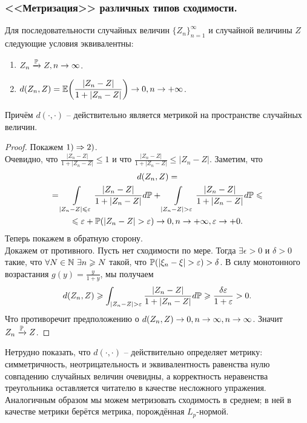 \subsubsection{<<Метризация>> различных типов сходимости.}
\begin{theorem}
    Для последовательности случайных величин $\{Z_n\}_{n = 1}^{\infty}$ и случайной величины $Z$ следующие условия эквивалентны:
    \begin{enumerate}
        \item $Z_n \xrightarrow{\P} Z, n \ra \infty$.
        \item $d(Z_n, Z) = \Ex\biggr( \dfrac{|Z_n - Z|}{1 + |Z_n - Z|}\biggr) \ra 0, n \ra +\infty$.
    \end{enumerate}
    Причём $d(\cdot, \cdot)$ -- действительно является метрикой на пространстве случайных величин.
\end{theorem}
\begin{proof}
    Покажем $1) \Ra 2)$. \\
    Очевидно, что $\frac{|Z_n - Z|}{1 + |Z_n - Z|} \leq 1$ и что $\frac{|Z_n - Z|}{1 + |Z_n - Z|} \leq |Z_n - Z|$.
    Заметим, что
    \begin{multline*}
        d(Z_n, Z) = \\ = \int\limits_{|Z_n - Z| \leq \epsilon} \dfrac{|Z_n - Z|}{1 + |Z_n - Z|}d\P + \int\limits_{|Z_n - Z| > \epsilon} \dfrac{|Z_n - Z|}{1 + |Z_n - Z|}d\P \leq \\ \leq \epsilon + \P(|Z_n - Z| > \epsilon) \ra 0, n \ra +\infty, \epsilon \ra +0.
    \end{multline*}
    Теперь покажем в обратную сторону. \\
    Докажем от противного. Пусть нет сходимости по мере. Тогда $\exists \epsilon > 0$ и $\delta > 0$ такие, что $\forall N \in \N \ \exists n \geq N$ такой, что $\P(|\xi_n - \xi| > \epsilon) > \delta$.
    В силу монотонного возрастания $g(y) = \frac{y}{1 + y}$, мы получаем
    \[
        d(Z_n, Z) \geq \int_{|Z_n - Z| > \epsilon} \dfrac{|Z_n - Z|}{1 + |Z_n - Z|}d\P \geq \dfrac{\delta \epsilon}{1 + \epsilon} > 0.
    \]
    Что противоречит предположению о $d(Z_n, Z) \ra 0, n \ra \infty, n \ra \infty$.
    Значит $Z_n \xrightarrow{\P} Z$.
\end{proof}
\begin{note}
    Нетрудно показать, что $d(\cdot, \cdot)$ -- действительно определяет метрику: симметричность, неотрицательность и эквивалентность равенства нулю совпадению случайных величин очевидны, а корректность неравенства треугольника оставляется читателю в качестве несложного упражения. \\
    Аналогичным образом мы можем метризовать сходимость в среднем; в ней в качестве метрики берётся метрика, порождённая $L_p$-нормой.
\end{note}
